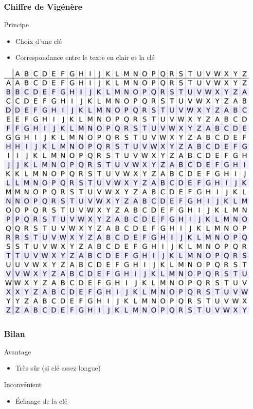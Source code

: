 \documentclass[xcolor={dvipsnames}]{beamer}
\begin{document}
\begin{frame}
\frametitle{Chiffre de Vigénère}

\begin{block}{Principe}
	\begin{itemize}
		\item Choix d'une clé
		\item Correspondance entre le texte en clair et la clé
	\end{itemize}
	
	\begin{center}
		\includegraphics[scale=0.07]{vigenere}
	\end{center}
\end{block}
\end{frame}

\begin{frame}
	\frametitle{Bilan}
	
	\begin{exampleblock}{Avantage}
		\begin{itemize}
			\item Très sûr (si clé assez longue)			
		\end{itemize}
	\end{exampleblock}
	
	\begin{alertblock}{Inconvénient}
		\begin{itemize}
			\item \'Echange de la clé
		\end{itemize}
	\end{alertblock}
	
\end{frame}
\end{document}

